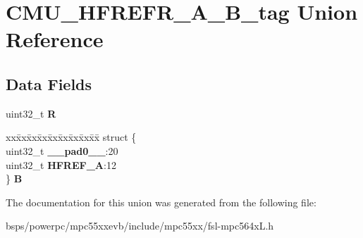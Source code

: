 \hypertarget{unionCMU__HFREFR__A__32B__tag}{}\section{C\+M\+U\+\_\+\+H\+F\+R\+E\+F\+R\+\_\+\+A\+\_\+B\+\_\+tag Union Reference}
\label{unionCMU__HFREFR__A__32B__tag}
\subsection*{Data Fields}
\begin{DoxyCompactItemize}
\item 
\mbox{\label{unionCMU__HFREFR__A__32B__tag_a0084e56258b9752808bb4d803dfd67b8}} 
uint32\+\_\+t {\bfseries R}
\item 
\mbox{\label{unionCMU__HFREFR__A__32B__tag_af40aa2da6583fa646d410b2cc4700ad8}} 
\begin{tabbing}
xx\=xx\=xx\=xx\=xx\=xx\=xx\=xx\=xx\=\kill
struct \{\\
\>uint32\_t {\bfseries \_\_pad0\_\_}:20\\
\>uint32\_t {\bfseries HFREF\_A}:12\\
\} {\bfseries B}\\

\end{tabbing}\end{DoxyCompactItemize}


The documentation for this union was generated from the following file\+:\begin{DoxyCompactItemize}
\item 
bsps/powerpc/mpc55xxevb/include/mpc55xx/fsl-\/mpc564x\+L.\+h\end{DoxyCompactItemize}
